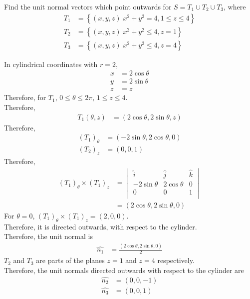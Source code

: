 \documentclass[fleqn, a4paper, 12pt, twoside]{article}
\theoremstyle{definition}
\theoremstyle{theorem}
\begin{document}
\begin{question}
	Find the unit normal vectors which point outwards for $S = T_1 \cup T_2 \cup T_3$, where
	\begin{align*}
		T_1 & = \left\{ (x,y,z) | x^2 + y^2 = 4 , 1 \le z \le 4 \right\} \\
		T_2 & = \left\{ (x,y,z) | x^2 + y^2 \le 4 , z = 1 \right\}       \\
		T_3 & = \left\{ (x,y,z) | x^2 + y^2 \le 4 , z = 4 \right\}
	\end{align*}
\end{question}

\begin{solution}
	In cylindrical coordinates with $r = 2$,
	\begin{align*}
		x & = 2 \cos \theta \\
		y & = 2 \sin \theta \\
		z & = z
	\end{align*}
	Therefore, for $T_1$, $0 \le \theta \le 2 \pi$, $1 \le z \le 4$.\\
	Therefore,
	\begin{align*}
		T_1(\theta,z) & = (2 \cos \theta , 2 \sin \theta , z)
	\end{align*}
	Therefore,
	\begin{align*}
		(T_1)_{\theta} & = (-2 \sin \theta , 2 \cos \theta , 0) \\
		(T_2)_z        & = (0 , 0 , 1)
	\end{align*}
	Therefore,
	\begin{align*}
		(T_1)_{\theta} \times (T_1)_z &=
			\begin{vmatrix}
				\hat{i}        & \hat{j}       & \hat{k} \\
				-2 \sin \theta & 2 \cos \theta & 0       \\
				0              & 0             & 1       \\
			\end{vmatrix}\\
			                      &= (2 \cos \theta , 2 \sin \theta , 0)
	\end{align*}
	For $\theta = 0$, $(T_1)_{\theta} \times (T_1)_z = (2,0,0)$.\\
	Therefore, it is directed outwards, with respect to the cylinder.\\
	Therefore, the unit normal is
	\begin{align*}
		\hat{n_1} & = \frac{(2 \cos \theta , 2 \sin \theta , 0)}{2}
	\end{align*}
	$T_2$ and $T_3$ are parts of the planes $z = 1$ and $z = 4$ respectively.\\
	Therefore, the unit normals directed outwards with respect to the cylinder are
	\begin{align*}
		\hat{n_2} & = (0,0,-1) \\
		\hat{n_3} & = (0,0,1)
	\end{align*}
\end{solution}
\end{document}
